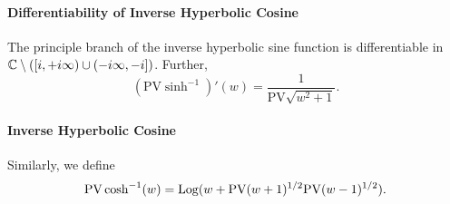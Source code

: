 \paragraph{Differentiability of Inverse Hyperbolic Cosine}
The principle branch of the inverse hyperbolic sine function is differentiable in \(\mathbb{C} \setminus ([i, +i\infty) \cup (-i\infty, -i])\). Further,
\[(\mathrm{PV}\sinh^{-1})'(w) = \frac{1}{\mathrm{PV}\sqrt{w^2 +1}}.\]

\paragraph{Inverse Hyperbolic Cosine}
Similarly, we define
\[\mathrm{PV}\cosh^{-1}(w) = \mathrm{Log}(w + \mathrm{PV}(w + 1)^{1/2}\mathrm{PV}(w-1)^{1/2}).\]